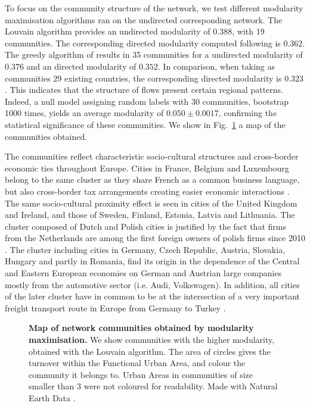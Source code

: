 \documentclass[10pt,letterpaper]{article}
\begin{document}
To focus on the community structure of the network, we test different modularity maximisation algorithms ran on the undirected corresponding network. The Louvain algorithm \cite{blondel2008fast} provides an undirected modularity of $0.388$, with 19 communities. The corresponding directed modularity computed following \cite{nicosia2009extending} is $0.362$. The greedy algorithm of \cite{clauset2004finding} results in 35 communities for a undirected modularity of $0.376$ and an directed modularity of $0.352$. In comparison, when taking as communities 29 existing countries, the corresponding directed modularity is $0.323$. This indicates that the structure of flows present certain regional patterns. Indeed, a null model assigning random labels with 30 communities, bootstrap 1000 times, yields an average modularity of $0.050 \pm 0.0017$, confirming the statistical significance of these communities. We show in Fig.~\ref{fig:fig2} a map of the communities obtained.

The communities reflect characteristic socio-cultural structures and cross-border economic ties throughout Europe. Cities in France, Belgium and Luxembourg belong to the same cluster as they share French as a common business language, but also cross-border tax arrangements creating easier economic interactions \cite{DecovilleDurand2019}. The same socio-cultural proximity effect is seen in cities of the United Kingdom and Ireland, and those of Sweden, Finland, Estonia, Latvia and Lithuania. The cluster composed of Dutch and Polish cities is justified by the fact that firms from the Netherlands are among the first foreign owners of polish firms since 2010 \cite{2020Zdanowska}. The cluster including cities in Germany, Czech Republic, Austria, Slovakia, Hungary and partly in Romania, find its origin in the dependence of the Central and Eastern European economies on German and Austrian large companies mostly from the automotive sector (i.e. Audi, Volkswagen). In addition, all cities of the later cluster have in common to be at the intersection of a very important freight transport route in Europe from Germany to Turkey \cite{Zdanowska2017}. 


\begin{figure}
    \begin{center}
    \end{center}
    \caption{{\bf Map of network communities obtained by modularity maximisation.} We show communities with the higher modularity, obtained with the Louvain algorithm. The area of circles gives the turnover within the Functional Urban Area, and colour the community it belongs to. Urban Areas in communities of size smaller than 3 were not coloured for readability. Made with Natural Earth Data \cite{naturalearth}.}
    \label{fig:fig2}
\end{figure}
\end{document}
